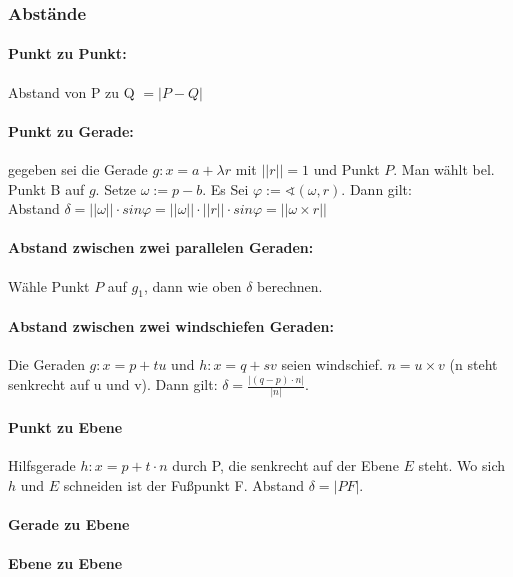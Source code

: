 \documentclass[a4paper, twocolumn]{article}
\begin{document}
       
   
   \subsubsection{Abstände}
      \paragraph{Punkt zu Punkt:}
      Abstand von P zu Q $= |P-Q|$
      
      \paragraph{Punkt zu Gerade:}
      gegeben sei die Gerade $g\colon x = a + \lambda r$ mit $||r|| = 1$ und Punkt $P$. 
      Man wählt bel. Punkt B auf $g$. Setze $\omega := p-b$. 
      Es Sei $\varphi := \sphericalangle(\omega, r)$. Dann gilt:\\
      Abstand $\delta = ||\omega|| \cdot sin \varphi = ||\omega|| \cdot ||r|| \cdot sin \varphi = ||\omega \times r||$
      
      \paragraph{Abstand zwischen zwei parallelen Geraden:}
      Wähle Punkt $P$ auf $g_1$, dann wie oben $\delta$ berechnen.

      \paragraph{Abstand zwischen zwei windschiefen Geraden:}
      Die Geraden $g: x = p +  tu$ und $h: x = q + sv$ seien windschief. $n = u \times v$ (n steht senkrecht auf u und v). Dann gilt: $\delta = \frac{|(q-p) \cdot n|}{|n|}$.

      \paragraph{Punkt zu Ebene}      
      Hilfsgerade $h: x = p + t \cdot n$ durch P, die senkrecht auf der Ebene $E$ steht. Wo sich $h$ und $E$ schneiden ist der Fußpunkt F. Abstand $\delta = |PF|$.

      \paragraph{Gerade zu Ebene}
      
      
      \paragraph{Ebene zu Ebene}
   
 
\end{document}

